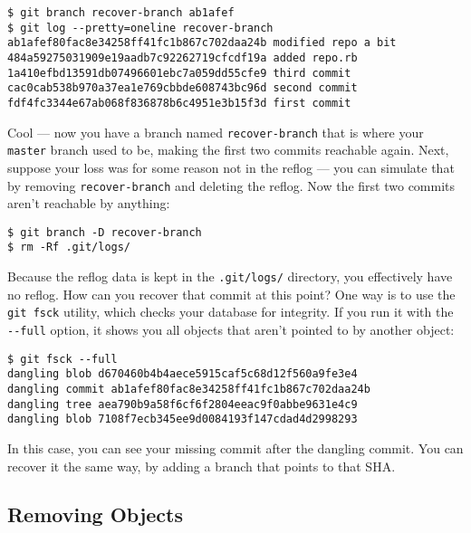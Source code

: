 \documentclass[a4paper]{book}
\newcounter{tab}[chapter]
\begin{document}
\begin{shaded}\begin{verbatim}
$ git branch recover-branch ab1afef
$ git log --pretty=oneline recover-branch
ab1afef80fac8e34258ff41fc1b867c702daa24b modified repo a bit
484a59275031909e19aadb7c92262719cfcdf19a added repo.rb
1a410efbd13591db07496601ebc7a059dd55cfe9 third commit
cac0cab538b970a37ea1e769cbbde608743bc96d second commit
fdf4fc3344e67ab068f836878b6c4951e3b15f3d first commit
\end{verbatim}\end{shaded}

Cool --- now you have a branch named \texttt{recover-branch} that is where your \texttt{master} branch used to be, making the first two commits reachable again. Next, suppose your loss was for some reason not in the reflog --- you can simulate that by removing \texttt{recover-branch} and deleting the reflog. Now the first two commits aren't reachable by anything:

\begin{shaded}\begin{verbatim}
$ git branch -D recover-branch
$ rm -Rf .git/logs/
\end{verbatim}\end{shaded}

Because the reflog data is kept in the \texttt{.git/logs/} directory, you effectively have no reflog. How can you recover that commit at this point? One way is to use the \texttt{git fsck} utility, which checks your database for integrity. If you run it with the \texttt{-{}-full} option, it shows you all objects that aren't pointed to by another object:

\begin{shaded}\begin{verbatim}
$ git fsck --full
dangling blob d670460b4b4aece5915caf5c68d12f560a9fe3e4
dangling commit ab1afef80fac8e34258ff41fc1b867c702daa24b
dangling tree aea790b9a58f6cf6f2804eeac9f0abbe9631e4c9
dangling blob 7108f7ecb345ee9d0084193f147cdad4d2998293
\end{verbatim}\end{shaded}

In this case, you can see your missing commit after the dangling commit. You can recover it the same way, by adding a branch that points to that SHA.

\subsection{Removing Objects}\label{removing-objects}
\end{document}

